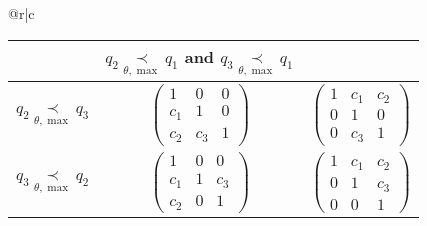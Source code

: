 \begin{center}
\begin{tabular*}{\textwidth}{@{\extracolsep{\fill}}r|c}
\begin{tabular}{c|c|c}
      &
      $q_2 \underset{\theta,\max}{\prec} q_1$ and
      $q_3 \underset{\theta,\max}{\prec} q_1$
      \tabularnewline
      \hline
      $q_2 \underset{\theta,\max}{\prec} q_3$ & $\begin{pmatrix}1 & 0 & 0\\
      c_1 & 1 & 0\\
      c_2 & c_3 & 1
    \end{pmatrix}$ & $\begin{pmatrix}1 & c_1 & c_2\\
      0 & 1 & 0\\
      0 & c_3 & 1
    \end{pmatrix}$\tabularnewline
    \hline
    $q_3 \underset{\theta,\max}{\prec} q_2$ & $\begin{pmatrix}1 & 0 & 0\\
    c_1 & 1 & c_3\\
    c_2 & 0 & 1
    \end{pmatrix}$ & $\begin{pmatrix}1 & c_1 & c_2\\
    0 & 1 & c_3\\
    0 & 0 & 1
    \end{pmatrix}$\tabularnewline
    \end{tabular}
  \end{tabular*}
  \TODO[correct?]
\end{center}

\begin{comment}
  \[
    \begin{pmatrix}1 & 0 & 0\\
    0 & 1 & 0\\
    1 & 0 & 1
    \end{pmatrix}
    \begin{pmatrix}1 & 1 & 0\\
    0 & 1 & 0\\
    1 & 0 & 1
    \end{pmatrix}
    =
    \begin{pmatrix}1 & 1 & 0\\
    0 & 1 & 0\\
    1 & \textbf{1} & 1
    \end{pmatrix}
  \]
\end{comment}

